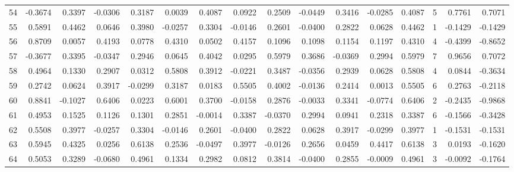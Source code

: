 \begin{tabular}{lrrrrrrrrrrrrrrr}
54  &     -0.3674 &  0.3397 & -0.0306 &  0.3187 &  0.0039 &  0.4087 &  0.0922 &  0.2509 & -0.0449 &  0.3416 &  -0.0285 &     0.4087 &      5 &                    0.7761 &                     0.7071 \\
55  &      0.5891 &  0.4462 &  0.0646 &  0.3980 & -0.0257 &  0.3304 & -0.0146 &  0.2601 & -0.0400 &  0.2822 &   0.0628 &     0.4462 &      1 &                   -0.1429 &                    -0.1429 \\
56  &      0.8709 &  0.0057 &  0.4193 &  0.0778 &  0.4310 &  0.0502 &  0.4157 &  0.1096 &  0.1098 &  0.1154 &   0.1197 &     0.4310 &      4 &                   -0.4399 &                    -0.8652 \\
57  &     -0.3677 &  0.3395 & -0.0347 &  0.2946 &  0.0645 &  0.4042 &  0.0295 &  0.5979 &  0.3686 & -0.0369 &   0.2994 &     0.5979 &      7 &                    0.9656 &                     0.7072 \\
58  &      0.4964 &  0.1330 &  0.2907 &  0.0312 &  0.5808 &  0.3912 & -0.0221 &  0.3487 & -0.0356 &  0.2939 &   0.0628 &     0.5808 &      4 &                    0.0844 &                    -0.3634 \\
59  &      0.2742 &  0.0624 &  0.3917 & -0.0299 &  0.3187 &  0.0183 &  0.5505 &  0.4002 & -0.0136 &  0.2414 &   0.0013 &     0.5505 &      6 &                    0.2763 &                    -0.2118 \\
60  &      0.8841 & -0.1027 &  0.6406 &  0.0223 &  0.6001 &  0.3700 & -0.0158 &  0.2876 & -0.0033 &  0.3341 &  -0.0774 &     0.6406 &      2 &                   -0.2435 &                    -0.9868 \\
61  &      0.4953 &  0.1525 &  0.1126 &  0.1301 &  0.2851 & -0.0014 &  0.3387 & -0.0370 &  0.2994 &  0.0941 &   0.2318 &     0.3387 &      6 &                   -0.1566 &                    -0.3428 \\
62  &      0.5508 &  0.3977 & -0.0257 &  0.3304 & -0.0146 &  0.2601 & -0.0400 &  0.2822 &  0.0628 &  0.3917 &  -0.0299 &     0.3977 &      1 &                   -0.1531 &                    -0.1531 \\
63  &      0.5945 &  0.4325 &  0.0256 &  0.6138 &  0.2536 & -0.0497 &  0.3977 & -0.0126 &  0.2656 &  0.0459 &   0.4417 &     0.6138 &      3 &                    0.0193 &                    -0.1620 \\
64  &      0.5053 &  0.3289 & -0.0680 &  0.4961 &  0.1334 &  0.2982 &  0.0812 &  0.3814 & -0.0400 &  0.2855 &  -0.0009 &     0.4961 &      3 &                   -0.0092 &                    -0.1764 \\

\end{tabular}
